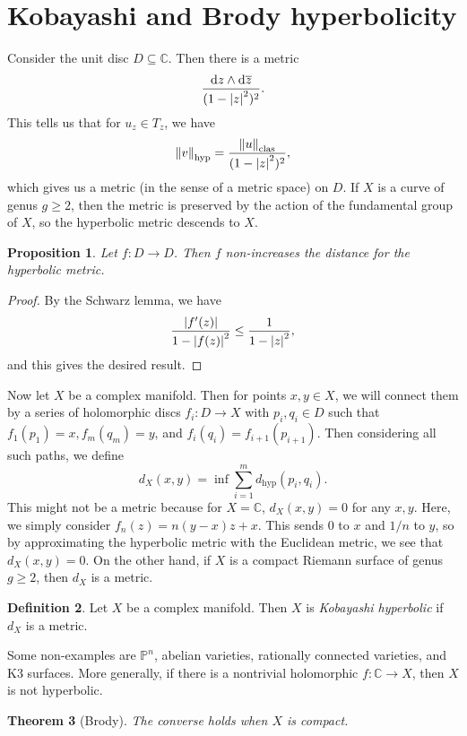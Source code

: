 \documentclass[leqno, openany]{memoir}
\newtheorem{thm}{Theorem}[section]
\newtheorem{prop}[thm]{Proposition}
\theoremstyle{definition}
\newtheorem{defn}[thm]{Definition}
\theoremstyle{remark}
\theoremstyle{plain}
\theoremstyle{definition}
\theoremstyle{remark}
\newcommand{\C}{\mathbb{C}}
\renewcommand{\P}{\mathbb{P}}
\newcommand{\mr}[1]{\mathrm{#1}}
\newcommand{\ol}[1]{\overline{#1}}
\begin{document}
\section{Kobayashi and Brody hyperbolicity}
Consider the unit disc $D \subseteq \C$. Then there is a metric
\[ \frac{\dd{z} \wedge \dd{\ol{z}}}{(1-\abs{z}^2)^2}. \]
This tells us that for $u_z \in T_z$, we have
\[ \norm{v}_{\mr{hyp}} = \frac{\norm{u}_{\mr{clas}}}{(1-\abs{z}^2)^2}, \]
which gives us a metric (in the sense of a metric space) on $D$. If $X$ is a curve of genus $g \geq 2$, then the metric is preserved by the action of the fundamental group of $X$, so the hyperbolic metric descends to $X$.

\begin{prop}
    Let $f \colon D \to D$. Then $f$ non-increases the distance for the hyperbolic metric.
\end{prop}

\begin{proof}
    By the Schwarz lemma, we have
    \[ \frac{\abs{f'(z)}}{1-\abs{f(z)}^2} \leq \frac{1}{1-\abs{z}^2}, \]
    and this gives the desired result.
\end{proof}

Now let $X$ be a complex manifold. Then for points $x, y \in X$, we will connect them by a series of holomorphic discs $f_i \colon D \to X$ with $p_i, q_i \in D$ such that $f_1(p_1) = x, f_m(q_m) = y$, and $f_i(q_i) = f_{i+1}(p_{i+1})$. Then considering all such paths, we define
\[ d_X(x, y) = \inf \sum_{i=1}^m d_{\mr{hyp}}(p_i, q_i). \]
This might not be a metric because for $X = \C$, $d_X(x,y) = 0$ for any $x,y$. Here, we simply consider $f_n(z) = n(y-x) z + x$. This sends $0$ to $x$ and $1/n$ to $y$, so by approximating the hyperbolic metric with the Euclidean metric, we see that $d_X(x,y) = 0$. On the other hand, if $X$ is a compact Riemann surface of genus $g \geq 2$, then $d_X$ is a metric.

\begin{defn}
    Let $X$ be a complex manifold. Then $X$ is \textit{Kobayashi hyperbolic} if $d_X$ is a metric.
\end{defn}

Some non-examples are $\P^n$, abelian varieties, rationally connected varieties, and K3 surfaces. More generally, if there is a nontrivial holomorphic $f \colon \C \to X$, then $X$ is not hyperbolic.

\begin{thm}[Brody]
    The converse holds when $X$ is compact.
\end{thm}
\end{document}
